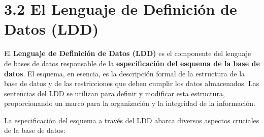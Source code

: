 \section{3.2 El Lenguaje de Definición de Datos (LDD)}

El \textbf{Lenguaje de Definición de Datos (LDD)} es el componente del lenguaje de bases de datos responsable de la \textbf{especificación del esquema de la base de datos}. El esquema, en esencia, es la descripción formal de la estructura de la base de datos y de las restricciones que deben cumplir los datos almacenados. Las sentencias del LDD se utilizan para definir y modificar esta estructura, proporcionando un marco para la organización y la integridad de la información.

La especificación del esquema a través del LDD abarca diversos aspectos cruciales de la base de datos:

